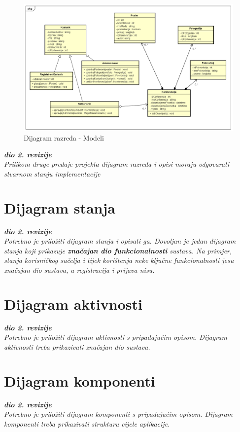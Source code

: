 			\begin{figure} [h]
				\includegraphics[width=\linewidth]{Slike/ClassDiagramModels}
				\caption{Dijagram razreda - Modeli}
			\end{figure}
			
			\textbf{\textit{dio 2. revizije}}\\			
			
			\textit{Prilikom druge predaje projekta dijagram razreda i opisi moraju odgovarati stvarnom stanju implementacije}
			
			
			
			\eject
		
		\section{Dijagram stanja}
			
			
			\textbf{\textit{dio 2. revizije}}\\
			
			\textit{Potrebno je priložiti dijagram stanja i opisati ga. Dovoljan je jedan dijagram stanja koji prikazuje \textbf{značajan dio funkcionalnosti} sustava. Na primjer, stanja korisničkog sučelja i tijek korištenja neke ključne funkcionalnosti jesu značajan dio sustava, a registracija i prijava nisu. }
			
			
			\eject 
		
		\section{Dijagram aktivnosti}
			
			\textbf{\textit{dio 2. revizije}}\\
			
			 \textit{Potrebno je priložiti dijagram aktivnosti s pripadajućim opisom. Dijagram aktivnosti treba prikazivati značajan dio sustava.}
			
			\eject
		\section{Dijagram komponenti}
		
			\textbf{\textit{dio 2. revizije}}\\
		
			 \textit{Potrebno je priložiti dijagram komponenti s pripadajućim opisom. Dijagram komponenti treba prikazivati strukturu cijele aplikacije.}